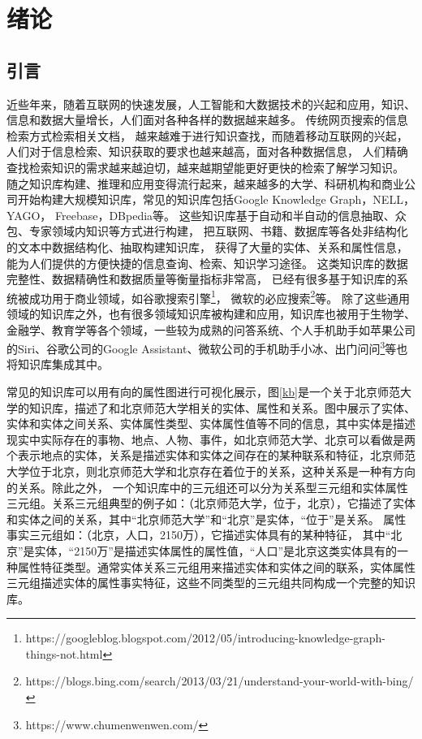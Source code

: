 

\chapter{绪论}
\label{cha:intro}
\section{引言}

近些年来，随着互联网的快速发展，人工智能和大数据技术的兴起和应用，知识、信息和数据大量增长，人们面对各种各样的数据越来越多。
传统网页搜索的信息检索方式检索相关文档，
越来越难于进行知识查找，而随着移动互联网的兴起，人们对于信息检索、知识获取的要求也越来越高，面对各种数据信息，
人们精确查找检索知识的需求越来越迫切，越来越期望能更好更快的检索了解学习知识。
随之知识库构建、推理和应用变得流行起来，越来越多的大学、科研机构和商业公司开始构建大规模知识库，常见的知识库包括Google Knowledge Graph\cite{Dong2014FromDF}，NELL\cite{NELL-aaai15}，YAGO\cite{Suchanek:2007:YCS:1242572.1242667}，
Freebase\cite{Bollacker2008FreebaseAC}，DBpedia\cite{Bizer:2009:DCP:1640541.1640848}等。
这些知识库基于自动和半自动的信息抽取\cite{Gao2005KnowledgeBasedIE}、众包\cite{Meng2017KnowledgeBS}、专家领域内知识\cite{Shenassa2008KnowledgeBE}等方式进行构建，
把互联网、书籍、数据库等各处非结构化的文本中数据结构化、抽取构建知识库，
获得了大量的实体、关系和属性信息，能为人们提供的方便快捷的信息查询、检索、知识学习途径。
这类知识库的数据完整性、数据精确性和数据质量等衡量指标非常高，
已经有很多基于知识库的系统被成功用于商业领域，如谷歌搜索引擎\footnote{https://googleblog.blogspot.com/2012/05/introducing-knowledge-graph-things-not.html}，
微软的必应搜索\footnote{https://blogs.bing.com/search/2013/03/21/understand-your-world-with-bing/}等。
除了这些通用领域的知识库之外，也有很多领域知识库被构建和应用，知识库也被用于生物学\cite{Dumontier:2014:BRL:2878453.2878554}、金融学、教育学等各个领域，一些较为成熟的问答系统、个人手机助手如苹果公司的Siri、谷歌公司的Google Assistant、微软公司的手机助手小冰、出门问问\footnote{https://www.chumenwenwen.com/}等也将知识库集成其中。

常见的知识库可以用有向的属性图进行可视化展示，图\ref{kb}是一个关于北京师范大学的知识库，描述了和北京师范大学相关的实体、属性和关系。图中展示了实体、实体和实体之间关系、实体属性类型、实体属性值等不同的信息，其中实体是描述现实中实际存在的事物、地点、人物、事件，如北京师范大学、北京可以看做是两个表示地点的实体，关系是描述实体和实体之间存在的某种联系和特征，北京师范大学位于北京，则北京师范大学和北京存在着位于的关系，这种关系是一种有方向的关系。除此之外，
一个知识库中的三元组还可以分为关系型三元组和实体属性三元组。关系三元组典型的例子如：（北京师范大学，位于，北京），它描述了实体和实体之间的关系，其中“北京师范大学”和“北京”是实体，“位于”是关系。
属性事实三元组如：（北京，人口，2150万），它描述实体具有的某种特征，
其中“北京”是实体，“2150万”是描述实体属性的属性值，“人口”是北京这类实体具有的一种属性特征类型。通常实体关系三元组用来描述实体和实体之间的联系，实体属性三元组描述实体的属性事实特征，这些不同类型的三元组共同构成一个完整的知识库。

